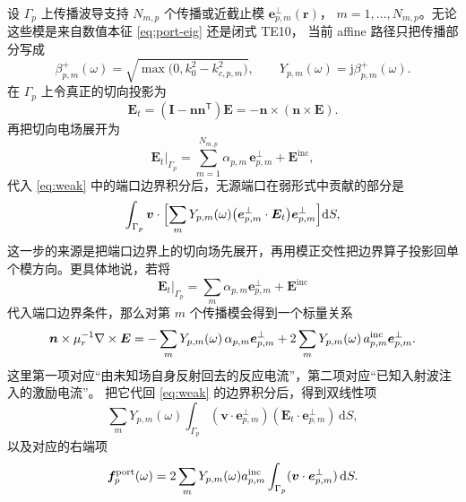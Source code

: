 \documentclass[UTF8,a4paper,11pt]{ctexart}
\newcommand{\dd}{\mathrm{d}}
\newcommand{\jj}{\mathrm{j}}
\newcommand{\transpose}{\mathsf{T}}
\begin{document}
设 $\Gamma_p$ 上传播波导支持 $N_{m,p}$ 个传播或近截止模 $\bm e_{p,m}^{\perp}(\bm r)$，
$m=1,\dots,N_{m,p}$。无论这些模是来自数值本征 \eqref{eq:port-eig} 还是闭式 TE10，
当前 affine 路径只把传播部分写成
\begin{equation}
    \beta_{p,m}^+(\omega)=\sqrt{\max\bigl(0,k_0^{2}-k_{c,p,m}^{2}\bigr)},\qquad
    Y_{p,m}(\omega)=\jj\beta_{p,m}^+(\omega).
    \label{eq:beta}
\end{equation}
在 $\Gamma_p$ 上令真正的切向投影为
\begin{equation}
    \bm E_t=(\bm I-\bm n\bm n^{\transpose})\bm E
           =-\bm n\times(\bm n\times\bm E).
    \label{eq:tangential-projection}
\end{equation}
再把切向电场展开为
\begin{equation}
    \bm E_t\big|_{\Gamma_p}
    =\sum_{m=1}^{N_{m,p}} \alpha_{p,m}\,\bm e_{p,m}^{\perp}+\bm E^{\text{inc}},
    \label{eq:port-expansion}
\end{equation}
代入 \eqref{eq:weak} 中的端口边界积分后，无源端口在弱形式中贡献的部分是
\begin{equation}
    \int_{\Gamma_p}\bm v\cdot
    \Bigl[\sum_mY_{p,m}(\omega)\bigl(\bm e_{p,m}^{\perp}\cdot\bm E_t\bigr)\bm e_{p,m}^{\perp}\Bigr]\dd S,
    \label{eq:port-bilinear}
\end{equation}
这一步的来源是把端口边界上的切向场先展开，再用模正交性把边界算子投影回单个模方向。更具体地说，若将
\begin{equation}
    \bm E_t\big|_{\Gamma_p}=\sum_m \alpha_{p,m}\bm e_{p,m}^{\perp}+\bm E^{\text{inc}}
\end{equation}
代入端口边界条件，那么对第 $m$ 个传播模会得到一个标量关系
\begin{equation}
    \bm n\times\mu_r^{-1}\nabla\times\bm E
    =-\sum_m Y_{p,m}(\omega)\,\alpha_{p,m}\bm e_{p,m}^{\perp}
    +2\sum_m Y_{p,m}(\omega)\,a_{p,m}^{\rm inc}\bm e_{p,m}^{\perp}.
\end{equation}
这里第一项对应“由未知场自身反射回去的反应电流”，第二项对应“已知入射波注入的激励电流”。
把它代回 \eqref{eq:weak} 的边界积分后，得到双线性项
\begin{equation}
    \sum_m Y_{p,m}(\omega)\int_{\Gamma_p}(\bm v\cdot\bm e_{p,m}^{\perp})(\bm E_t\cdot\bm e_{p,m}^{\perp})\,\dd S,
\end{equation}
以及对应的右端项
\begin{equation}
    \bm f_{p}^{\rm port}(\omega)
    =2\sum_m Y_{p,m}(\omega)a_{p,m}^{\rm inc}
    \int_{\Gamma_p}(\bm v\cdot\bm e_{p,m}^{\perp})\,\dd S.
    \label{eq:port-rhs-weak}
\end{equation}
\end{document}

